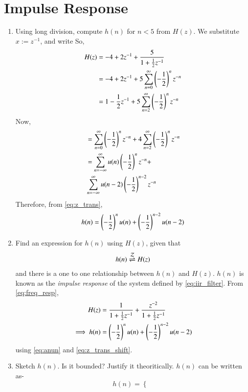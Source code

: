 \documentclass[journal,12pt,twocolumn]{IEEEtran}
\renewcommand\thesection{\arabic{section}}
\begin{document}
\section{Impulse Response}
\begin{enumerate}[label=\thesection.\arabic*]	
\item Using long division, compute $h(n)$ for $n < 5$ from $H(z)$.
\solution We substitute $x := z^{-1}$, and write
So,
\begin{align}
	H(z) &= -4 + 2z^{-1} + \frac{5}{1 + \frac{1}{2}z^{-1}} \\
	&= -4 + 2z^{-1} + 5\sum_{n = 0}^{\infty}\left(-\frac{1}{2}\right)^nz^{-n} \\
	&= 1 - \frac{1}{2}z^{-1} + 5\sum_{n = 2}^{\infty}\left(-\frac{1}{2}\right)^nz^{-n} 
\end{align}	
Now,
\begin{align}
	&= \sum_{n = 0}^{\infty}\left(-\frac{1}{2}\right)^nz^{-n} + 4\sum_{n = 2}^{\infty}\left(-\frac{1}{2}\right)^nz^{-n} \\
	&= \sum_{n = -\infty}^{\infty}u(n)\left(-\frac{1}{2}\right)^nz^{-n} + \nonumber \\
	&\sum_{n = -\infty}^{\infty}u(n - 2)\left(-\frac{1}{2}\right)^{n - 2}z^{-n}
\end{align}	
Therefore, from \eqref{eq:z_trans}, 
\begin{align}
	h(n) = \left(-\frac{1}{2}\right)^{n}u(n) + \left(-\frac{1}{2}\right)^{n-2}u(n-2)
\end{align}
\item \label{prob:impulse_resp}
Find an expression for $h(n)$ using $H(z)$, given that 
\begin{equation}
	\label{eq:impulse_resp}
	h(n) \overset{\mathcal{Z}}{ \rightleftharpoons} H(z)
\end{equation}
and there is a one to one relationship between $h(n)$ and $H(z)$. $h(n)$ is known as the {\em impulse response} of the
system defined by \eqref{eq:iir_filter}.
\solution From \eqref{eq:freq_resp},
\begin{align}
	H(z) &= \frac{1}{1 + \frac{1}{2}z^{-1}} + \frac{ z^{-2}}{1 + \frac{1}{2}z^{-1}} \\
	\implies h(n) &= \left(-\frac{1}{2}\right)^{n}u(n) + \left(-\frac{1}{2}\right)^{n-2}u(n-2)
\end{align}
using \eqref{eq:anun} and \eqref{eq:z_trans_shift}.
\item Sketch $h(n)$. Is it bounded? Justify it theoritically.
\solution  $h(n)$ can be written as-
\begin{equation}
	\label{eq:hn}
	h(n)
	=
	\begin{cases}

\end{cases}
\end{equation}
\end{enumerate}
\end{document}
